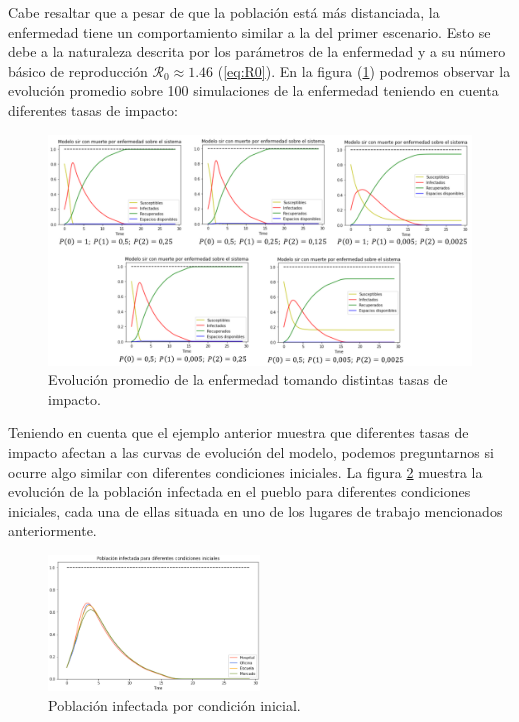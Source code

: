 Cabe resaltar que a pesar de que la población está más distanciada, la enfermedad tiene un comportamiento similar a la del primer escenario. Esto se debe a la naturaleza descrita por los parámetros de la enfermedad y a su número básico de reproducción $\mathcal{R}_0\approx 1.46$ (\ref{eq:R0}). En la figura (\ref{fig:comparacionTasasdeImpacto}) podremos observar la evolución promedio sobre 100 simulaciones de la enfermedad teniendo en cuenta diferentes tasas de impacto:

\begin{figure}[h]
  \centering
    \includegraphics[width=1.05\textwidth]{Imagenes/comparacionTasasImpacto.PNG}
    \caption{Evolución promedio de la enfermedad tomando distintas tasas de impacto.}
    \label{fig:comparacionTasasdeImpacto}
\end{figure}

Teniendo en cuenta que el ejemplo anterior muestra que diferentes tasas de impacto afectan a las curvas de evolución del modelo, podemos preguntarnos si ocurre algo similar con diferentes condiciones iniciales. La figura \ref{fig:condicionesIniciales} muestra la evolución de la población infectada en el pueblo para diferentes condiciones iniciales, cada una de ellas situada en uno de los lugares de trabajo mencionados anteriormente.

\begin{figure}[h]
  \centering
    \includegraphics[width=0.5\textwidth]{Imagenes/condicionesIniciales.png}
    \caption{Población infectada por condición inicial.}
    \label{fig:condicionesIniciales}
\end{figure}

